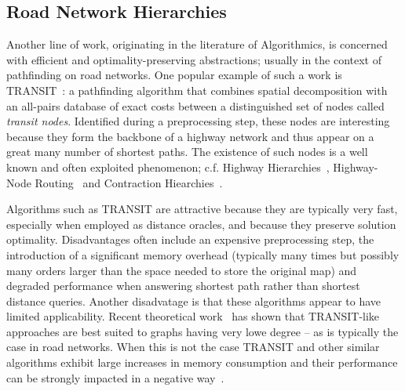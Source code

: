 \subsection{Road Network Hierarchies}
Another line of work, originating in the literature of Algorithmics, is concerned with efficient 
and optimality-preserving abstractions; usually in the context of pathfinding on road networks.
One popular example of such a work is TRANSIT~\citep{bast06,bast07}: a pathfinding algorithm that combines
spatial decomposition with an all-pairs database of exact costs between a distinguished set of nodes
called \emph{transit nodes}. Identified during a preprocessing step, these nodes are interesting 
because they form the backbone of a highway network and thus appear on a great many number of 
shortest paths. The existence of such nodes is a well known and often exploited
phenomenon; c.f. Highway Hierarchies~\citep{sanders05,sanders06}, Highway-Node Routing~\citep{schultes07}
and Contraction Hiearchies~\citep{geisberger08}. 

Algorithms such as TRANSIT are attractive because they are typically very fast, especially when
employed as distance oracles, and because they preserve solution optimality. Disadvantages often
include an expensive preprocessing step, the introduction of a significant memory overhead
(typically many times but possibly many orders larger than the space needed to store the original
map) and degraded performance when answering shortest path rather than shortest distance queries.
Another disadvatage is that these algorithms appear to have limited applicability. Recent
theoretical work~\citep{abraham10} has shown that TRANSIT-like approaches are best suited to graphs
having very lowe degree -- as is typically the case in road networks.  When this is not the case
TRANSIT and other similar algorithms exhibit large increases in memory consumption and their
performance can be strongly impacted in a negative way~\citep{antsfeld12}.
